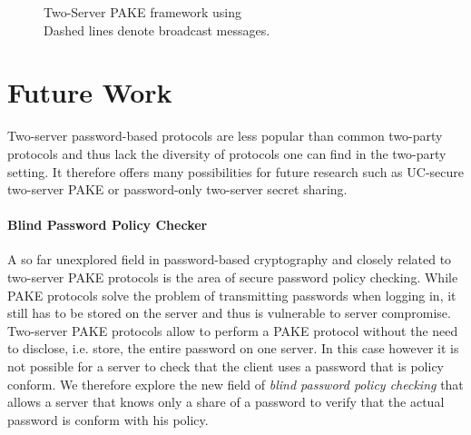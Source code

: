 \begin{sidewaysfigure}[htbp]
\caption[Two-Server PAKE framework using \SPHFF]{Two-Server PAKE framework using \SPHFF
\\{\tiny Dashed lines denote broadcast messages.}}
\label{fig:twopake}
\end{sidewaysfigure}

\section{Future Work}
Two-server password-based protocols are less popular than common two-party protocols and thus lack the diversity of protocols one can find in the two-party setting.
It therefore offers many possibilities for future research such as \ac{UC}-secure two-server \ac{PAKE} or password-only two-server secret sharing.

\paragraph{Blind Password Policy Checker} \label{sec:policies}
A so far unexplored field in password-based cryptography and closely related to two-server \ac{PAKE} protocols is the area of secure password policy checking.
While \ac{PAKE} protocols solve the problem of transmitting passwords when logging in, it still has to be stored on the server and thus is vulnerable to server compromise.
Two-server \ac{PAKE} protocols allow to perform a \ac{PAKE} protocol without the need to disclose, i.e. store, the entire password on one server.
In this case however it is not possible for a server to check that the client uses a password that is policy conform.
We therefore explore the new field of \emph{blind password policy checking} that allows a server that knows only a share of a password to verify that the actual password is conform with his policy.


